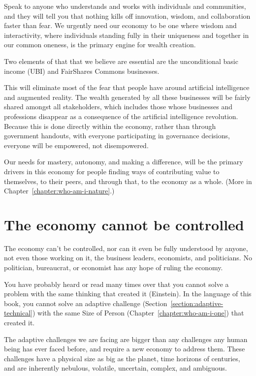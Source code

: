 Speak to anyone who understands and works with individuals and communities, and they will tell you that nothing kills off innovation, wisdom, and collaboration faster than fear. We urgently need our economy to be one where wisdom and interactivity, where individuals standing fully in their uniqueness and together in our common oneness, is the primary engine for wealth creation.


Two elements of that that we believe are essential are the unconditional basic income (UBI) and FairShares Commons businesses.


This will eliminate most of the fear that people have around artificial intelligence and augmented reality. The wealth generated by all these businesses will be fairly shared amongst all stakeholders, which includes those whose businesses and professions disappear as a consequence of the artificial intelligence revolution. Because this is done directly within the economy, rather than through government handouts, with everyone participating in governance decisions, everyone will be empowered, not disempowered.


Our needs for mastery, autonomy, and making a difference, will be the primary drivers in this economy for people finding ways of contributing value to themselves, to their peers, and through that, to the economy as a whole. (More in Chapter~\ref{chapter:who-am-i-nature}.)


\section{The economy cannot be controlled}
The economy can’t be controlled, nor can it even be fully understood by anyone, not even those working on it, the business leaders, economists, and politicians. No politician, bureaucrat, or economist has any hope of ruling the economy.


You have probably heard or read many times over that you cannot solve a problem with the same thinking that created it (Einstein). In the language of this book, you cannot solve an adaptive challenge (Section~\ref{section:adaptive-technical}) with the same Size of Person (Chapter~\ref{chapter:who-am-i-one}) that created it.


The adaptive challenges we are facing are bigger than any challenges any human being has ever faced before, and require a new economy to address them. These challenges have a physical size as big as the planet, time horizons of centuries, and are inherently nebulous, volatile, uncertain, complex, and ambiguous. 


